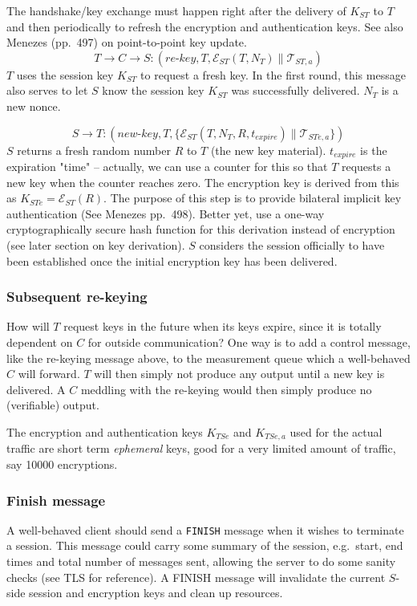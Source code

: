 The handshake/key exchange must happen right after the delivery of $K_{ST}$ to $T$ and then periodically to refresh the encryption and authentication keys. See also Menezes (pp.\ 497) on point-to-point key update.
\[
T \rightarrow C \rightarrow S: (\textit{re-key},T,\mathcal{E}_{ST}(T,N_T) \parallel \mathcal{T}_{ST,a})
\]
$T$ uses the session key $K_{ST}$ to request a fresh key. In the first round, this message also serves to let $S$ know the session key $K_{ST}$ was successfully delivered. $N_T$ is a new nonce.

\[
S \rightarrow T: (\textit{new-key},T, \{ \mathcal{E}_{ST}(T,N_T,R,t_{expire}) \parallel \mathcal{T}_{STe,a} \} )
\]
$S$ returns a fresh random number $R$ to $T$ (the new key material). $t_{expire}$ is the expiration "time" -- actually, we can use a counter for this so that $T$ requests a new key when the counter reaches zero. The encryption key is derived from this as $K_{STe}=\mathcal{E}_{ST}(R)$. The purpose of this step is to provide bilateral implicit key authentication (See Menezes pp.\ 498). Better yet, use a one-way cryptographically secure hash function for this derivation instead of encryption (see later section on key derivation). $S$ considers the session officially to have been established once the initial encryption key has been delivered.

\subsubsection{Subsequent re-keying}

How will $T$ request keys in the future when its keys expire, since it is totally dependent on $C$ for outside communication? One way is to add a control message, like the re-keying message above, to the measurement queue which a well-behaved $C$ will forward. $T$ will then simply not produce any output until a new key is delivered. A $C$ meddling with the re-keying would then simply produce no (verifiable) output.

The encryption and authentication keys $K_{TSe}$ and $K_{TSe,a}$ used for the actual traffic are short term \textit{ephemeral} keys, good for a very limited amount of traffic, say 10000 encryptions.

\subsubsection{Finish message}

A well-behaved client should send a \texttt{FINISH} message when it wishes to terminate a session. This message could carry some summary of the session, e.g.\ start, end times and total number of messages sent, allowing the server to do some sanity checks (see TLS for reference). A FINISH message will invalidate the current $S$-side session and encryption keys and clean up resources. 

